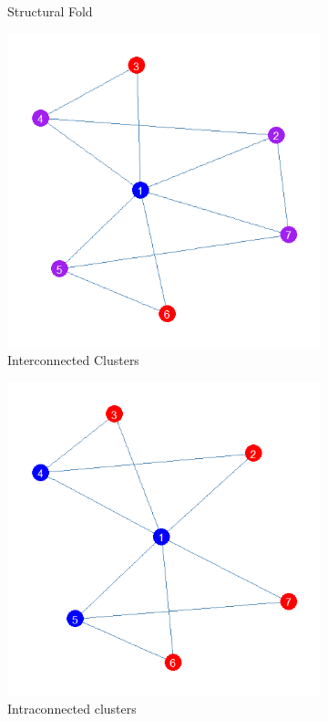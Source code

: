 \documentclass[12pt]{article}
\begin{document}
\begin{figure}
\begin{subfigure}[b]{0.45\textwidth}
            \caption{Structural Fold}
            \label{fig:sf}
    \end{subfigure}
     \begin{subfigure}[b]{0.45\textwidth}
        \includegraphics[width=1.0\textwidth]{Plots/inter.png}
            \caption{Interconnected Clusters}
            \label{fig:inter}
    \end{subfigure}
     \begin{subfigure}[b]{0.45\textwidth}
        \includegraphics[width=1.0\textwidth]{Plots/intra.png}
            \caption{Intraconnected clusters}
            \label{fig:intra}
    \end{subfigure}
    \caption{}
    \label{fig:toys}
\end{figure}
\end{document}
